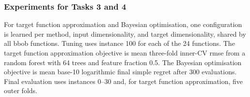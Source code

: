 \subsubsection{Experiments for Tasks 3 and 4}

For target function approximation and Bayesian optimisation, one configuration is learned per method, input dimensionality, and target dimensionality, shared by all \gls{bbob} functions. Tuning uses instance 100 for each of the 24 functions. The target function approximation objective is mean three-fold inner-CV \gls{rmse} from a random forest with 64 trees and feature fraction 0.5. The Bayesian optimisation objective is mean base-10 logarithmic final simple regret after 300 evaluations. Final evaluation uses instances 0--30 and, for target function approximation, five outer folds.



